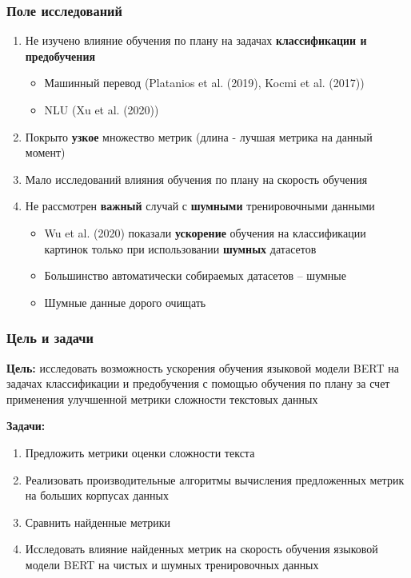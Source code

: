 \documentclass{beamer}
\begin{document}
\begin{frame}
	\frametitle{Поле исследований}

	\begin{enumerate}
		\item Не изучено влияние обучения по плану на задачах {\bf классификации и предобучения}
			\begin{itemize}
				\item Машинный перевод (Platanios et al. (2019), Kocmi et al. (2017))
				\item NLU (Xu et al. (2020))
			\end{itemize}
		\item Покрыто {\bf узкое} множество метрик (длина - лучшая метрика на данный момент)
		\item Мало исследований влияния обучения по плану на скорость обучения
		\item Не рассмотрен {\bf важный} случай с {\bf шумными} тренировочными данными
		\begin{itemize}
			\item Wu et al. (2020) показали {\bf ускорение} обучения на классификации картинок только при использовании {\bf шумных} датасетов
			\item Большинство автоматически собираемых датасетов -- шумные
			\item Шумные данные дорого очищать
		\end{itemize}
	\end{enumerate}\end{frame}

\begin{frame}
	\frametitle{Цель и задачи}
	{\bf Цель:} исследовать возможность ускорения обучения языковой модели BERT на задачах классификации и предобучения с помощью обучения по плану за счет применения улучшенной метрики сложности текстовых данных
	
	{\bf Задачи:}
	\begin{enumerate}
		\item Предложить метрики оценки сложности текста
		\item Реализовать производительные алгоритмы вычисления предложенных метрик на больших корпусах данных
		\item Сравнить найденные метрики
		\item Исследовать влияние найденных метрик на скорость обучения языковой модели BERT на чистых и шумных тренировочных данных
	\end{enumerate}
\end{frame}
\end{document}
